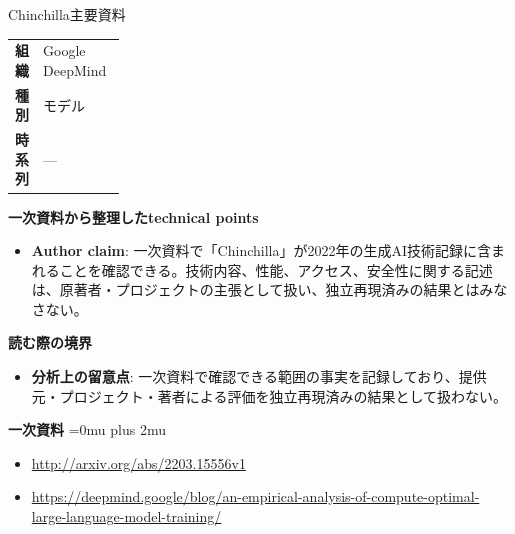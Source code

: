 \begin{technicalnote}{Chinchilla}{主要資料}
\begingroup
\begin{tabularx}{\linewidth}{@{}>{\bfseries}p{0.22\linewidth}X@{}}
組織 & Google DeepMind \\
種別 & モデル \\
時系列 & — \\
\end{tabularx}
\smallskip
{\bfseries 一次資料から整理したtechnical points}
\begin{itemize}[leftmargin=1.5em,itemsep=0.35em]
\item \textbf{Author claim}: 一次資料で「Chinchilla」が2022年の生成AI技術記録に含まれることを確認できる。技術内容、性能、アクセス、安全性に関する記述は、原著者・プロジェクトの主張として扱い、独立再現済みの結果とはみなさない。
\end{itemize}
\begin{minipage}{\linewidth}
{\bfseries 読む際の境界}
\begin{itemize}[leftmargin=1.5em,itemsep=0.35em]
\item \textbf{分析上の留意点}: 一次資料で確認できる範囲の事実を記録しており、提供元・プロジェクト・著者による評価を独立再現済みの結果として扱わない。
\end{itemize}
\begin{samepage}
{\bfseries 一次資料}
\begingroup\sloppy
\Urlmuskip=0mu plus 2mu\relax
\begin{itemize}[leftmargin=1.5em,itemsep=0.25em]
\item {\scriptsize\url{http://arxiv.org/abs/2203.15556v1}}
\item {\scriptsize\url{https://deepmind.google/blog/an-empirical-analysis-of-compute-optimal-large-language-model-training/}}
\end{itemize}
\endgroup
\end{samepage}
\end{minipage}
\endgroup
\end{technicalnote}
\medskip

